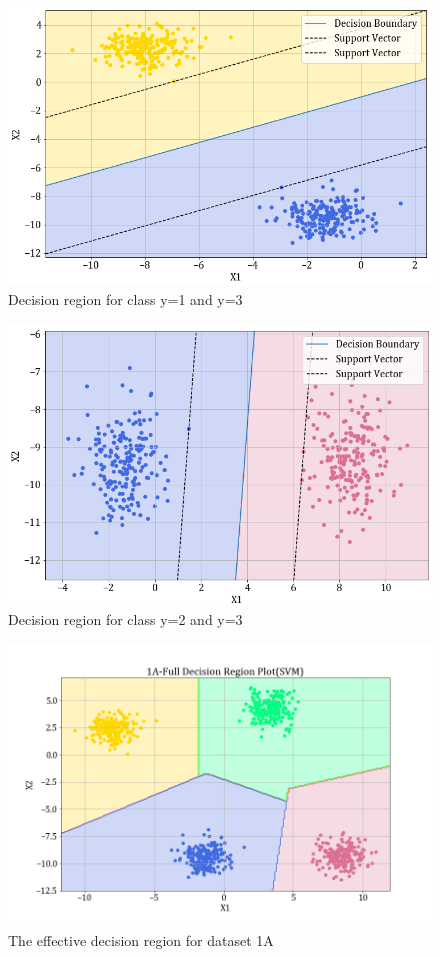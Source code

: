\documentclass[11pt,a4paper]{article}
\begin{document}
\begin{figure}[H]
    \centering
    \includegraphics[scale=0.55]{images/1A_ovo_13.png}
    \caption{Decision region for class y=1 and y=3}
\end{figure}

\begin{figure}[H]
    \centering
    \includegraphics[scale=0.55]{images/1A_ovo_23.png}
    \caption{Decision region for class y=2 and y=3}
\end{figure}

\begin{figure}[H]
    \centering
    \includegraphics[scale=0.55]{images/1A_SVM_full_decision_plot.png}
    \caption{The effective decision region for dataset 1A}
\end{figure}
\end{document}

